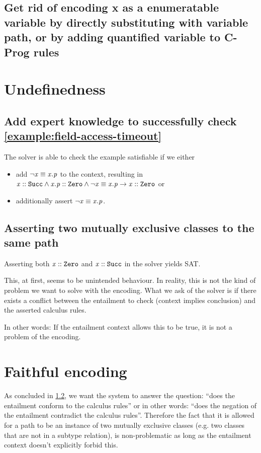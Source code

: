 \documentclass[a4paper]{article}
\begin{document}
\subsection{Get rid of encoding x as a enumeratable variable by directly substituting with variable path, or by adding quantified variable to C-Prog rules}

\section{Undefinedness}
\subsection{Add expert knowledge to successfully check \ref{example:field-access-timeout}}
The solver is able to check the example satisfiable if we either
\begin{itemize}
  \item add $\neg \mathit{x} \equiv \mathit{x.p}$ to the context, resulting in ${\mathit{x} :: \mathit{\mathtt{Succ}} \land \mathit{x.p} :: \mathit{\mathtt{Zero}} \land \neg \mathit{x} \equiv \mathit{x.p}} \rightarrow {\ensuremath{\mathit{x} :: \mathit{\mathtt{Zero}}}}$ or
  \item additionally assert $\neg \mathit{x} \equiv \mathit{x.p}$.
\end{itemize}

\subsection{Asserting two mutually exclusive classes to the same path}
\label{section:mutually-exclusive-classes}
Asserting both $\mathit{x} :: \mathit{\mathtt{Zero}}$ and $\mathit{x} :: \mathit{\mathtt{Succ}}$ in the solver yields SAT.

This, at first, seems to be unintended behaviour.
In reality, this is not the kind of problem we want to solve with the encoding.
What we ask of the solver is if there exists a conflict between
the entailment to check (context implies conclusion)
and the asserted calculus rules.

In other words: If the entailment context allows this to be true,
it is not a problem of the encoding.

 \section{Faithful encoding}
 As concluded in \ref{section:mutually-exclusive-classes},
 we want the system to answer the question:
 ``does the entailment conform to the calculus rules'' or in other words:
 ``does the negation of the entailment contradict the calculus rules''.
 Therefore the fact that it is allowed for a path to be an instance of
 two mutually exclusive classes (e.g. two classes that are not in a subtype relation),
 is non-problematic as long as the entailment context doesn't explicitly forbid this.
\end{document}
